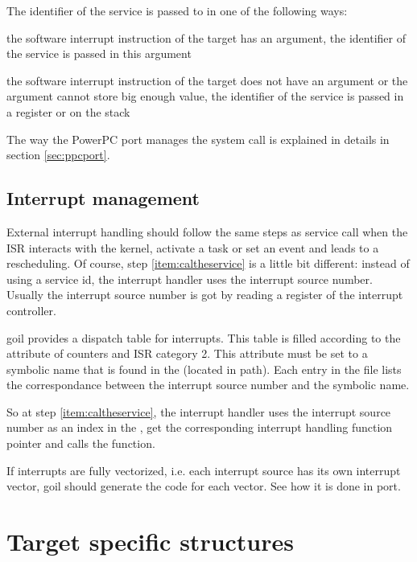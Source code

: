The identifier of the service is passed to  in one of the following ways:
\begin{pitemize}
\item the software interrupt instruction of the target has an argument, the identifier of the service is passed in this argument
\item the software interrupt instruction of the target does not have an argument or the argument cannot store big enough value, the identifier of the service is passed in a register or on the stack
\end{pitemize}
 

The way the PowerPC port manages the system call is explained in details in section \ref{sec:ppcport}.

\subsection{Interrupt management}

External interrupt handling should follow the same steps as service call when the ISR interacts with the kernel, activate a task or set an event and leads to a rescheduling. Of course, step  \ref{item:caltheservice} is a little bit different: instead of using a service id, the interrupt handler uses the interrupt source number. Usually the interrupt source number is got by reading a register of the interrupt controller.

goil provides a dispatch table for interrupts. This table is filled according to the  attribute of counters and ISR category 2. This attribute must be set to a symbolic name that is found in the  (located in  path). Each entry in the  file lists the correspondance between the interrupt source number and the symbolic name.

So at step   \ref{item:caltheservice}, the interrupt handler uses the interrupt source number as an index in the , get the corresponding interrupt handling function pointer and calls the function.

If interrupts are fully vectorized, i.e. each interrupt source has its own interrupt vector, goil should generate the code for each vector. See how it is done in  port.

\section{Target specific structures}

